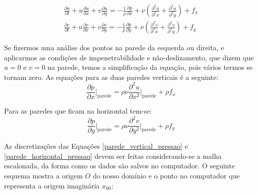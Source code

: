 \documentclass[journal]{IEEEtran}
\begin{document}
\begin{eqnarray}
\frac{\partial u}{\partial t}+u\frac{\partial u}{\partial x}+v\frac{\partial
u}{\partial y}=-\frac{1}{\rho}\frac{\partial p}{\partial
x}+\nu\left(\frac{\partial^2 u}{\partial^2 x}+\frac{\partial^2 u}{\partial^2
y}\right)+f_x\\
\frac{\partial v}{\partial t}+u\frac{\partial v}{\partial x}+v\frac{\partial
v}{\partial y}=-\frac{1}{\rho}\frac{\partial p}{\partial
y}+\nu\left(\frac{\partial^2 v}{\partial^2 x}+\frac{\partial^2 v}{\partial^2
y}\right)+f_y
\end{eqnarray}

Se fizermos uma análise dos pontos na parede da esquerda ou
direita, e aplicarmos as condições de impenetrabilidade e não-deslizamento\cite{notas_de_aula_john}, que
dizem que $u=0$ e $v=0$ na parede, temos a simplificação da equação, pois vários
termos se tornam zero. As equações para as duas paredes verticais é a seguinte:
\begin{equation}
\frac{\partial p}{\partial x}\Bigg|_{\textrm{parede}}=\rho\nu\frac{\partial^2
u}{\partial x^2}\Bigg|_{\textrm{parede}}+\rho f_x \label{parede_vertical_pressao}
\end{equation}

Para as paredes que ficam na horizontal tem-se:
\begin{equation}
\frac{\partial p}{\partial y}\Bigg|_{\textrm{parede}}=\rho\nu\frac{\partial^2
v}{\partial y^2}\Bigg|_{\textrm{parede}}+\rho f_y \label{parede_horizontal_pressao}
\end{equation}

As discretizações das Equações \ref{parede_vertical_pressao} e \ref{parede_horizontal_pressao} devem ser feitas considerando-se a malha escalonada, da forma como os dados são salvos no computador. O seguinte esquema mostra a origem $O$ do nosso domínio e o ponto no computador que representa a origem imaginária $x_{00}$:
\end{document}
